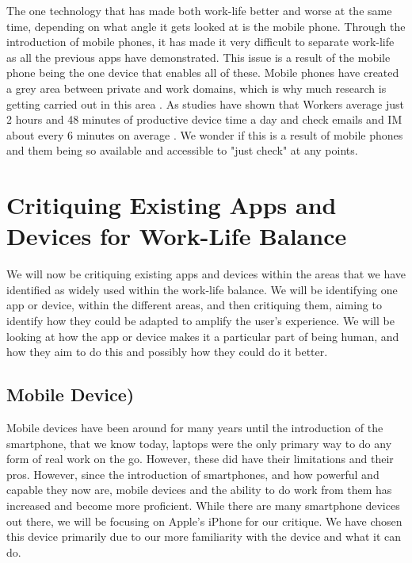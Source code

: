 \documentclass{sigchi}
\begin{document}
	The one technology that has made both work-life better and worse at the same time, depending on what angle it gets looked at is the mobile phone. Through the introduction of mobile phones, it has made it very difficult to separate work-life \cite{gronvall2016hci, sadler2006balancing} as all the previous apps have demonstrated. This issue is a result of the mobile phone being the one device that enables all of these. Mobile phones have created a grey area between private and work domains, which is why much research is getting carried out in this area \cite{fleck2015balancing}. As studies have shown that Workers average just 2 hours and 48 minutes of productive device time a day and check emails and IM about every 6 minutes on average \cite{rescuetime_study}. We wonder if this is a result of mobile phones and them being so available and accessible to "just check" at any points.
	
	\section{Critiquing Existing Apps and Devices for Work-Life Balance}
	
	We will now be critiquing existing apps and devices within the areas that we have identified as widely used within the work-life balance. We will be identifying one app or device, within the different areas, and then critiquing them, aiming to identify how they could be adapted to amplify the user's experience. We will be looking at how the app or device makes it a particular part of being human, and how they aim to do this and possibly how they could do it better.
	
		\subsection{Mobile Device)}
		Mobile devices have been around for many years until the introduction of the smartphone, that we know today, laptops were the only primary way to do any form of real work on the go. However, these did have their limitations and their pros. However, since the introduction of smartphones, and how powerful and capable they now are, mobile devices and the ability to do work from them has increased and become more proficient. While there are many smartphone devices out there, we will be focusing on Apple's iPhone for our critique. We have chosen this device primarily due to our more familiarity with the device and what it can do. 
		
\end{document}
